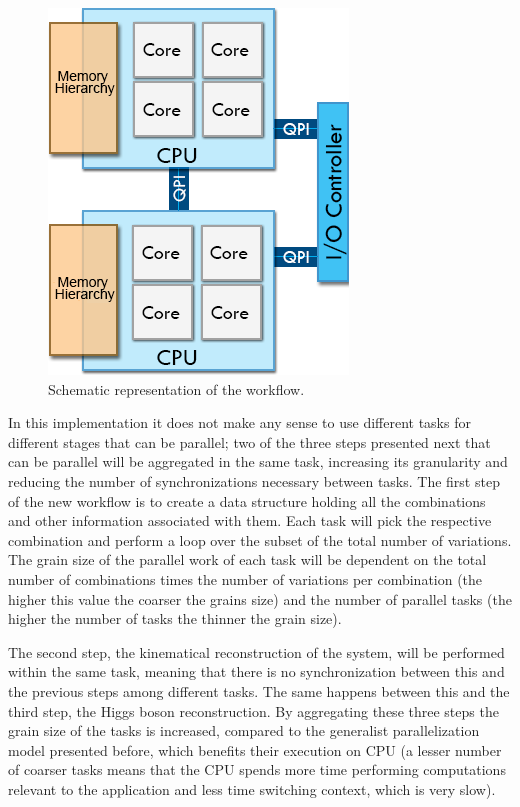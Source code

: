 \begin{figure}[!htp]
	\begin{center}
		\includegraphics[scale=0.5]{../../common/img/numa_qpi.png}
		\caption{Schematic representation of the \ttDilepKinFit workflow.}
		\label{fig:SharedMemPipeline}
	\end{center}
\end{figure}

In this implementation it does not make any sense to use different tasks for different stages that can be parallel; two of the three steps presented next that can be parallel will be aggregated in the same task, increasing its granularity and reducing the number of synchronizations necessary between tasks. The first step of the new workflow is to create a data structure holding all the combinations and other information associated with them. Each task will pick the respective combination and perform a loop over the subset of the total number of variations. The grain size of the parallel work of each task will be dependent on the total number of combinations times the number of variations per combination (the higher this value the coarser the grains size) and the number of parallel tasks (the higher the number of tasks the thinner the grain size).

The second step, the kinematical reconstruction of the \ttbar system, will be performed within the same task, meaning that there is no synchronization between this and the previous steps among different tasks. The same happens between this and the third step, the Higgs boson reconstruction. By aggregating these three steps the grain size of the tasks is increased, compared to the generalist parallelization model presented before, which benefits their execution on CPU (a lesser number of coarser tasks means that the CPU spends more time performing computations relevant to the application and less time switching context, which is very slow).

